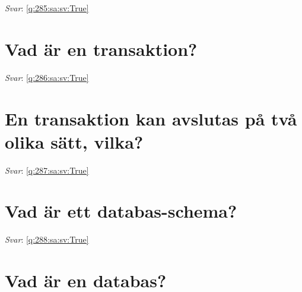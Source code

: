 \documentclass[a4paper,11pt,oneside]{book}
\begin{document}
\begin{sloppypar}
\vspace{2cm}

\noindent\makebox[\textwidth]{\hrulefill}

\vspace{1cm}

\textit{Svar}: \autoref{q:285:sa:sv:True}



\section{Vad \"ar en transaktion?}

\label{q:286:sa:sv:False}

\vspace{2cm}

\noindent\makebox[\textwidth]{\hrulefill}

\vspace{1cm}

\textit{Svar}: \autoref{q:286:sa:sv:True}



\section{En transaktion kan avslutas p\r{a} tv\r{a} olika s\"att, vilka?}

\label{q:287:sa:sv:False}

\vspace{2cm}

\noindent\makebox[\textwidth]{\hrulefill}

\vspace{1cm}

\textit{Svar}: \autoref{q:287:sa:sv:True}



\section{Vad \"ar ett databas-schema?}

\label{q:288:sa:sv:False}

\vspace{2cm}

\noindent\makebox[\textwidth]{\hrulefill}

\vspace{1cm}

\textit{Svar}: \autoref{q:288:sa:sv:True}



\section{Vad \"ar en databas?}


\end{sloppypar}
\end{document}
